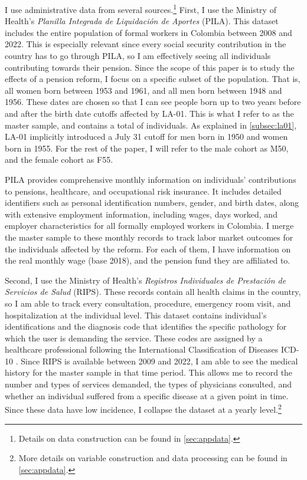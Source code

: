 \documentclass[12pt, a4paper]{article}
\begin{document}
I use administrative data from several sources.\footnote{Details on data construction can be found in \autoref{sec:appdata}.} First, I use the Ministry of Health's \textit{Planilla Integrada de Liquidación de Aportes} (PILA). This dataset includes the entire population of formal workers in Colombia between 2008 and 2022. This is especially relevant since every social security contribution in the country has to go through PILA, so I am effectively seeing all individuals contributing towards their pension. Since the scope of this paper is to study the effects of a pension reform, I focus on a specific subset of the population. That is, all women born between 1953 and 1961, and all men born between 1948 and 1956. These dates are chosen so that I can see people born up to two years before and after the birth date cutoffs affected by LA-01. This is what I refer to as the master sample, and contains a total of  individuals. As explained in \autoref{subsec:la01}, LA-01 implicitly introduced a July 31 cutoff for men born in 1950 and women born in 1955. For the rest of the paper, I will refer to the male cohort as M50, and the female cohort as F55.

PILA provides comprehensive monthly information on individuals' contributions to pensions, healthcare, and occupational risk insurance. It includes detailed identifiers such as personal identification numbers, gender, and birth dates, along with extensive employment information, including wages, days worked, and employer characteristics for all formally employed workers in Colombia. I merge the master sample to these monthly records to track labor market outcomes for the individuals affected by the reform. For each of them, I have information on the real monthly wage (base 2018), and the pension fund they are affiliated to.

Second, I use the Ministry of Health's \textit{Registros Individuales de Prestación de Servicios de Salud} (RIPS). These records contain all health claims in the country, so I am able to track every consultation, procedure, emergency room visit, and hospitalization at the individual level. This dataset contains individual's identifications and the diagnosis code that identifies the specific pathology for which the user is demanding the service. These codes are assigned by a healthcare professional following the International Classification of Diseases ICD-10 \citep{icd10}. Since RIPS is available between 2009 and 2022, I am able to see the medical history for the master sample in that time period. This allows me to record the number and types of services demanded, the types of physicians consulted, and whether an individual suffered from a specific disease at a given point in time. Since these data have low incidence, I collapse the dataset at a yearly level.\footnote{More details on variable construction and data processing can be found in \autoref{sec:appdata}.}
\end{document}
